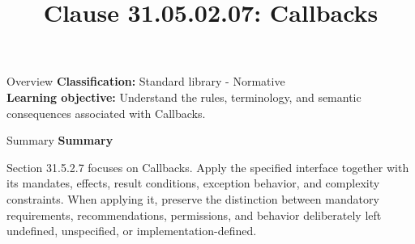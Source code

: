 \documentclass[10pt,letterpaper]{article}
\title{Clause 31.05.02.07: Callbacks}
\author{}
\date{}
\begin{document}
\maketitle
\begin{CornellOverviewBox}{Overview}
\textbf{Classification:} Standard library - Normative\\[2pt]
\textbf{Learning objective:} Understand the rules, terminology, and semantic consequences associated with Callbacks.
\end{CornellOverviewBox}\begin{CornellSummaryBox}{Summary}
{\sffamily\bfseries\color{Accent} Summary}\par\vspace{3pt}Section 31.5.2.7 focuses on Callbacks. Apply the specified interface together with its mandates, effects, result conditions, exception behavior, and complexity constraints. When applying it, preserve the distinction between mandatory requirements, recommendations, permissions, and behavior deliberately left undefined, unspecified, or implementation-defined.
\end{CornellSummaryBox}
\end{document}
